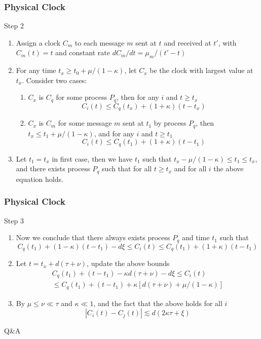 \documentclass{beamer}
\begin{document}
\frame
{
  \frametitle{Physical Clock}
  \begin{block}{Step 2}
  \begin{enumerate}
  	\item<1-> Assign a clock $C_m$ to each message $m$ sent at $t$ and received at $t'$, with $C_m(t)=t$ and constant rate $dC_m/dt=\mu_m/(t'-t)$
  	\item<2-> For any time $t_x\geq t_0+\mu/(1-\kappa)$, let $C_x$ be the clock with largest value at $t_x$. Consider two cases:
  		\begin{enumerate}
  			\item<3-> $C_x$ is $C_q$ for some process $P_q$, then for any $i$ and $t\geq t_x$
  			\[C_i(t)\leq C_q(t_x)+(1+\kappa)(t-t_x)\]
  			\item<4-> $C_x$ is $C_m$ for some message $m$ sent at $t_1$ by process $P_q$, then $t_x\leq t_1+\mu/(1-\kappa)$, and for any $i$ and $t\geq t_1$
  			\[C_i(t)\leq C_q(t_1)+(1+\kappa)(t-t_1)\]
  		\end{enumerate}
  	\item<5-> Let $t_1=t_x$ in first case, then we have $t_1$ such that $t_x-\mu/(1-\kappa)\leq t_1\leq t_x$, and there exists process $P_q$ such that for all $t\geq t_x$ and for all $i$ the above equation holds.
  \end{enumerate}
  \end{block}
}

\frame
{
  \frametitle{Physical Clock}
  \begin{block}{Step 3}
  \begin{enumerate}
  	\item<1-> Now we conclude that there always exists process $P_q$ and time $t_1$ such that
  	\[C_q(t_1)+(1-\kappa)(t-t_1)-d\xi\leq C_i(t)\leq C_q(t_1)+(1+\kappa)(t-t_1)\]
  	\item<2-> Let $t=t_x+d(\tau+\nu)$, update the above bounds
  	\begin{eqnarray*}C_q(t_1)+(t-t_1)-\kappa d(\tau+\nu)-d\xi\leq C_i(t)\\\leq C_q(t_1)+(t-t_1)+\kappa[d(\tau+\nu)+\mu/(1-\kappa)]\end{eqnarray*}
  	\item<3-> By $\mu\leq\nu\ll\tau$ and $\kappa\ll 1$, and the fact that the above holds for all $i$
  	\[|C_i(t)-C_j(t)|\lesssim d(2\kappa\tau+\xi)\]
  \end{enumerate}
  \end{block}
}

\frame
{
  \center\huge{Q\&A}
}
\end{document}
